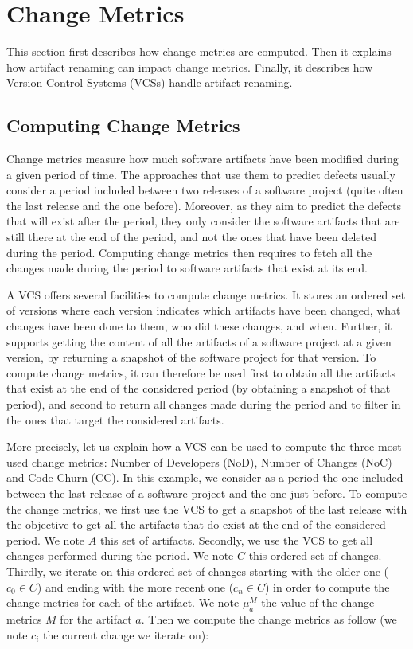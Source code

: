 \section{Change Metrics}
\label{sec:changemetrics}

This section first describes how change metrics are computed. Then it explains how artifact renaming can impact change metrics. Finally, it describes how Version Control Systems (VCSs) handle artifact renaming.

\subsection{Computing Change Metrics}

Change metrics measure how much software artifacts have been modified during a given period of time. The approaches that use them to predict defects usually consider a period included between two releases of a software project (quite often the last release and the one before). Moreover, as they aim to predict the defects that will exist after the period, they only consider the software artifacts that are still there at the end of the period, and not the ones that have been deleted during the period. Computing change metrics then requires to fetch all the changes made during the period to software artifacts that exist at its end.

A VCS offers several facilities to compute change metrics. It stores an ordered set of versions where each version indicates which artifacts have been changed, what changes have been done to them, who did these changes, and when. Further, it supports getting the content of all the artifacts of a software project at a given version, by returning a snapshot of the software project for that version. To compute change metrics, it can therefore be used first to obtain all the artifacts that exist at the end of the considered period (by obtaining a snapshot of that period), and second to return all changes made during the period and to filter in the ones that target the considered artifacts.

More precisely, let us explain how a VCS can be used to compute the three most used change metrics: Number of Developers (NoD), Number of Changes (NoC) and Code Churn (CC). In this example, we consider as a period the one included between the last release of a software project and the one just before. To compute the change metrics, we first use the VCS to get a snapshot of the last release with the objective to get all the artifacts that do exist at the end of the considered period. We note $A$ this set of artifacts. Secondly, we use the VCS to get all changes performed during the period. We note $C$ this ordered set of changes. Thirdly, we iterate on this ordered set of changes starting with the older one ($c_0 \in C$) and ending with the more recent one ($c_n \in C$) in order to compute the change metrics for each of the artifact. We note $\mu_{a}^{M}$ the value of the change metrics $M$ for the artifact $a$. Then we compute the change metrics as follow (we note $c_i$ the current change we iterate on):

